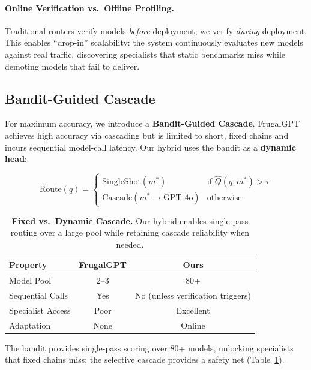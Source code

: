 \paragraph{Online Verification vs.\ Offline Profiling.} Traditional routers verify models \emph{before} deployment; we verify \emph{during} deployment. This enables ``drop-in'' scalability: the system continuously evaluates new models against real traffic, discovering specialists that static benchmarks miss while demoting models that fail to deliver.

\subsection{Bandit-Guided Cascade}
\label{sec:hybrid}

For maximum accuracy, we introduce a \textbf{Bandit-Guided Cascade}. FrugalGPT~\cite{chen2023frugalgpt} achieves high accuracy via cascading but is limited to short, fixed chains and incurs sequential model-call latency. Our hybrid uses the bandit as a \textbf{dynamic head}:

\begin{equation}
\text{Route}(q) = 
\begin{cases}
\text{SingleShot}(m^*) & \text{if } \hat{Q}(q, m^*) > \tau \\
\text{Cascade}(m^* \to \text{GPT-4o}) & \text{otherwise}
\end{cases}
\label{eq:hybrid}
\end{equation}

\begin{table}[t]
\centering
\small
\caption{\textbf{Fixed vs.\ Dynamic Cascade.} Our hybrid enables single-pass routing over a large pool while retaining cascade reliability when needed.}
\label{tab:scaling_comparison}
\begin{tabular}{lcc}
\toprule
\textbf{Property} & \textbf{FrugalGPT} & \textbf{Ours} \\
\midrule
Model Pool & 2--3 & 80+ \\
Sequential Calls & Yes & No (unless verification triggers) \\
Specialist Access & Poor & Excellent \\
Adaptation & None & Online \\
\bottomrule
\end{tabular}
\end{table}

The bandit provides single-pass scoring over 80+ models, unlocking specialists that fixed chains miss; the selective cascade provides a safety net (Table~\ref{tab:scaling_comparison}).
